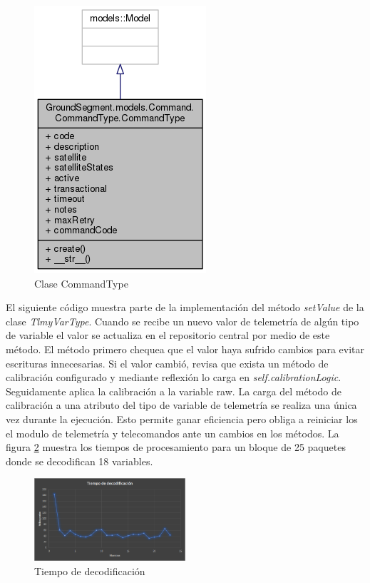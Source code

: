 \documentclass[twoside,twocolumn]{article}
\begin{document}
{{\begin{figure}[!htb]
\begin{minipage}{0.2\textwidth}
        \centering
        \includegraphics[width=0.5\linewidth]{Imagenes/CommandType.png}
        \caption{Clase CommandType}
        \label{fig:prob1_6_1}
    \end{minipage}
\end{figure}

El siguiente código muestra parte de la implementación del método \textit{setValue} de la clase \textit{TlmyVarType}. Cuando se recibe un nuevo valor de telemetría de algún tipo de variable el valor se actualiza en el repositorio central por medio de este método. El método primero chequea que el valor haya sufrido cambios para evitar escrituras innecesarias. Si el valor cambió, revisa que exista un método de calibración configurado y mediante reflexión lo carga en \textit{self.calibrationLogic}. Seguidamente aplica la calibración a la variable raw. La carga del método de calibración a una atributo del tipo de variable de telemetría se realiza una única vez durante la ejecución. Esto permite ganar eficiencia pero obliga a reiniciar los el modulo de telemetría y telecomandos ante un cambios en los métodos. La figura \ref{fig:TiempoDecodificacion} muestra los tiempos de procesamiento para un bloque de 25 paquetes donde se decodifican 18 variables.

\begin{figure}[]
  \caption{Tiempo de decodificación}
  \label{fig:TiempoDecodificacion}
  \centering
  \includegraphics[width=0.5\textwidth]{Imagenes/tiempoDecodificacion.png}
\end{figure}

}}
\end{document}
